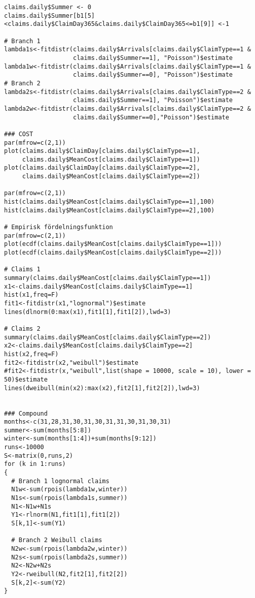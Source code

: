 \documentclass[11pt]{article}
\begin{document}
\begin{verbatim}
claims.daily$Summer <- 0
claims.daily$Summer[b1[5]<claims.daily$ClaimDay365&claims.daily$ClaimDay365<=b1[9]] <-1

# Branch 1
lambda1s<-fitdistr(claims.daily$Arrivals[claims.daily$ClaimType==1 &
                   claims.daily$Summer==1], "Poisson")$estimate
lambda1w<-fitdistr(claims.daily$Arrivals[claims.daily$ClaimType==1 &
                   claims.daily$Summer==0], "Poisson")$estimate
# Branch 2
lambda2s<-fitdistr(claims.daily$Arrivals[claims.daily$ClaimType==2 &
                   claims.daily$Summer==1], "Poisson")$estimate
lambda2w<-fitdistr(claims.daily$Arrivals[claims.daily$ClaimType==2 &
                   claims.daily$Summer==0],"Poisson")$estimate

### COST
par(mfrow=c(2,1))
plot(claims.daily$ClaimDay[claims.daily$ClaimType==1],
     claims.daily$MeanCost[claims.daily$ClaimType==1])
plot(claims.daily$ClaimDay[claims.daily$ClaimType==2],
     claims.daily$MeanCost[claims.daily$ClaimType==2])

par(mfrow=c(2,1))
hist(claims.daily$MeanCost[claims.daily$ClaimType==1],100)
hist(claims.daily$MeanCost[claims.daily$ClaimType==2],100)

# Empirisk fördelningsfunktion
par(mfrow=c(2,1))
plot(ecdf(claims.daily$MeanCost[claims.daily$ClaimType==1]))
plot(ecdf(claims.daily$MeanCost[claims.daily$ClaimType==2]))

# Claims 1
summary(claims.daily$MeanCost[claims.daily$ClaimType==1])
x1<-claims.daily$MeanCost[claims.daily$ClaimType==1]
hist(x1,freq=F)
fit1<-fitdistr(x1,"lognormal")$estimate
lines(dlnorm(0:max(x1),fit1[1],fit1[2]),lwd=3)

# Claims 2
summary(claims.daily$MeanCost[claims.daily$ClaimType==2])
x2<-claims.daily$MeanCost[claims.daily$ClaimType==2]
hist(x2,freq=F)
fit2<-fitdistr(x2,"weibull")$estimate
#fit2<-fitdistr(x,"weibull",list(shape = 10000, scale = 10), lower = 50)$estimate
lines(dweibull(min(x2):max(x2),fit2[1],fit2[2]),lwd=3)


### Compound
months<-c(31,28,31,30,31,30,31,31,30,31,30,31)
summer<-sum(months[5:8])
winter<-sum(months[1:4])+sum(months[9:12])
runs<-10000
S<-matrix(0,runs,2)
for (k in 1:runs)
{
  # Branch 1 lognormal claims
  N1w<-sum(rpois(lambda1w,winter))
  N1s<-sum(rpois(lambda1s,summer))
  N1<-N1w+N1s
  Y1<-rlnorm(N1,fit1[1],fit1[2])
  S[k,1]<-sum(Y1)
  
  # Branch 2 Weibull claims
  N2w<-sum(rpois(lambda2w,winter))
  N2s<-sum(rpois(lambda2s,summer))
  N2<-N2w+N2s
  Y2<-rweibull(N2,fit2[1],fit2[2])
  S[k,2]<-sum(Y2)
}


\end{verbatim}
\end{document}
